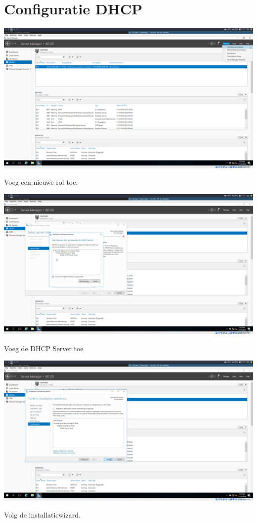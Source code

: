 \documentclass[a4paper]{article}
\begin{document}
\section{Configuratie DHCP}
\begin{center}
	\includegraphics[width=15cm]{Pictures/DC1/DHCP/1542299853.png}
	
	Voeg een nieuwe rol toe.
\end{center}
\begin{center}
	\includegraphics[width=15cm]{Pictures/DC1/DHCP/1542299861.png}
	
	Voeg de DHCP Server toe
\end{center}
\begin{center}
	\includegraphics[width=15cm]{Pictures/DC1/DHCP/1542299870.png}
	
	Volg de installatiewizard.
\end{center}
\end{document}
